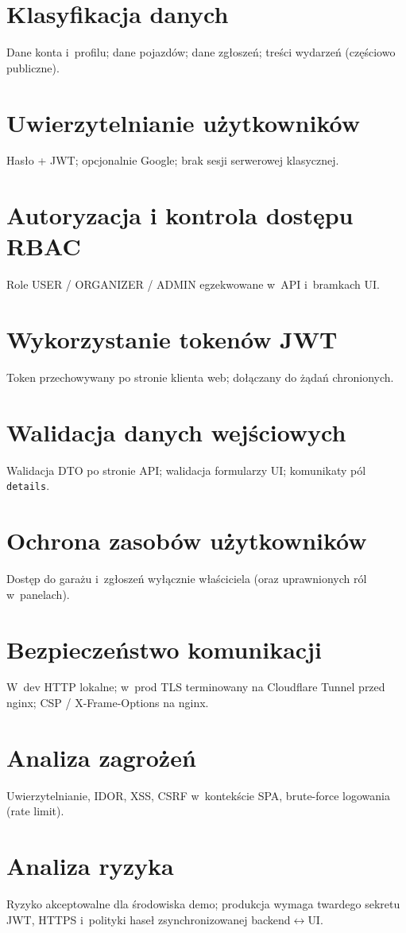 \documentclass{sprz}
\begin{document}
\section{Klasyfikacja danych}  
Dane konta i~profilu; dane pojazdów; dane zgłoszeń; treści wydarzeń (częściowo publiczne).  
\section{Uwierzytelnianie użytkowników}  
Hasło + JWT; opcjonalnie Google; brak sesji serwerowej klasycznej.  
\section{Autoryzacja i kontrola dostępu RBAC}  
Role USER / ORGANIZER / ADMIN egzekwowane w~API i~bramkach UI.  
\section{Wykorzystanie tokenów JWT}  
Token przechowywany po stronie klienta web; dołączany do żądań chronionych.  
\section{Walidacja danych wejściowych}  
Walidacja DTO po stronie API; walidacja formularzy UI; komunikaty pól \texttt{details}.  
\section{Ochrona zasobów użytkowników}  
Dostęp do garażu i~zgłoszeń wyłącznie właściciela (oraz uprawnionych ról w~panelach).  
\section{Bezpieczeństwo komunikacji}  
W~dev HTTP lokalne; w~prod TLS terminowany na Cloudflare Tunnel przed nginx; CSP / X-Frame-Options na nginx.  
\section{Analiza zagrożeń}  
Uwierzytelnianie, IDOR, XSS, CSRF w~kontekście SPA, brute-force logowania (rate limit).  
\section{Analiza ryzyka}  
Ryzyko akceptowalne dla środowiska demo; produkcja wymaga twardego sekretu JWT, HTTPS i~polityki haseł zsynchronizowanej backend$\leftrightarrow$UI.  
\end{document}
